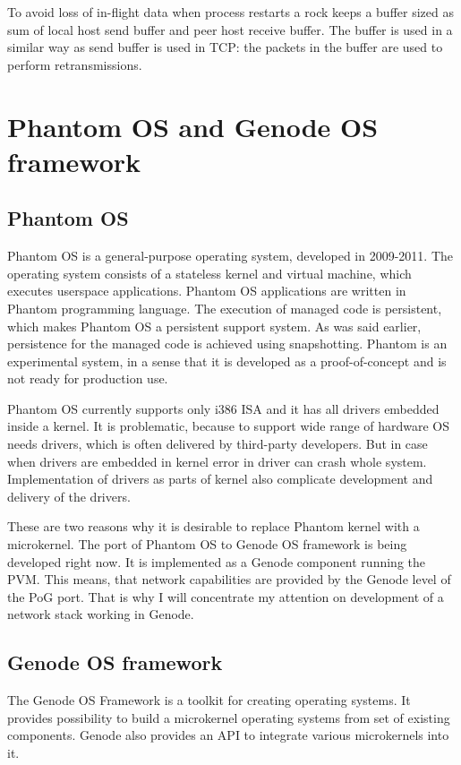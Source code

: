 To avoid loss of in-flight data when process restarts a rock keeps a buffer
sized as sum of local host send buffer and peer host receive buffer. The buffer
is used in a similar way as send buffer is used in TCP: the packets in the
buffer are used to perform retransmissions.

\section{Phantom OS and Genode OS framework}
\subsection{Phantom OS}

Phantom OS is a general-purpose operating system, developed in 2009-2011. The
operating system consists of a stateless kernel and virtual machine, which
executes userspace applications. Phantom OS applications are written in Phantom
programming language. The execution of managed code is persistent, which makes
Phantom OS a persistent support system. As was said earlier, persistence for the
managed code is achieved using snapshotting. Phantom is an experimental system,
in a sense that it is developed as a proof-of-concept and is not ready for
production use.

Phantom OS currently supports only i386 ISA and it has all drivers embedded 
inside a kernel. It is problematic, because to support wide range of hardware
OS needs drivers, which is often delivered by third-party developers. But in
case when drivers are embedded in kernel error in driver can crash whole system.
Implementation of drivers as parts of kernel also complicate development and
delivery of the drivers.

These are two reasons why it is desirable to replace Phantom kernel with a 
microkernel. The port of Phantom OS to Genode OS framework is being developed
right now. It is implemented as a Genode component running the PVM. This means,
that network capabilities are provided by the Genode level of the PoG port. That
is why I will concentrate my attention on development of a network stack working
in Genode.

\subsection{Genode OS framework} 
The Genode OS Framework \cite{genode_foundations} is a toolkit for creating 
operating systems. It provides possibility to build a microkernel operating
systems from set of existing components. Genode also provides an API to
integrate various microkernels into it.

